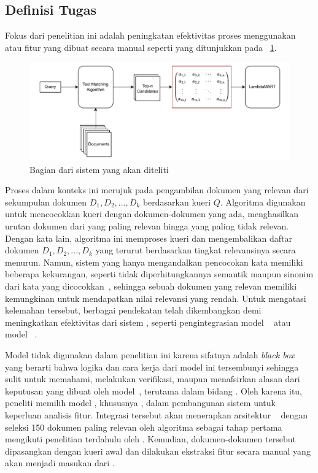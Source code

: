\subsection{Definisi Tugas}
\label{subbab:3:Definisi Tugas}
Fokus dari penelitian ini adalah peningkatan efektivitas proses \retrieval{} menggunakan \hcf{} atau fitur yang dibuat secara manual seperti yang ditunjukkan pada \gambar{}~\ref{fig:posisiPenelitian}.
\begin{figure}[!ht]
    \centering
    \includegraphics[scale=0.75]{assets/pdfs/PosisiPenelitian.pdf}
    \caption{Bagian dari sistem \ir{} yang akan diteliti}
    \label{fig:posisiPenelitian}
\end{figure}
Proses \retrieval{} dalam konteks ini merujuk pada pengambilan dokumen yang relevan dari sekumpulan dokumen \(D_1,D_2,...,D_k\) berdasarkan kueri \(Q\). Algoritma \txt{} \matching{} digunakan untuk mencocokkan kueri dengan dokumen-dokumen yang ada, menghasilkan urutan dokumen dari yang paling relevan hingga yang paling tidak relevan. Dengan kata lain, algoritma ini memproses kueri dan mengembalikan daftar dokumen \(D_1,D_2,...,D_k\) yang terurut berdasarkan tingkat relevansinya secara menurun. Namun, sistem \ir{} yang hanya mengandalkan pencocokan kata memiliki beberapa kekurangan, seperti tidak diperhitungkannya semantik maupun sinonim dari kata yang dicocokkan~\citep{hambarde2023information}, sehingga sebuah dokumen yang relevan memiliki kemungkinan untuk mendapatkan nilai relevansi yang rendah. Untuk mengatasi kelemahan tersebut, berbagai pendekatan telah dikembangkan demi meningkatkan efektivitas dari sistem \ir{}, seperti pengintegrasian model \ml{}~\citep{burges2010ranknet} atau model \nn{}~\citep{1223700}.

Model \nn{} tidak digunakan dalam penelitian ini karena sifatnya adalah \textit{black box} yang berarti bahwa logika dan cara kerja dari model ini tersembunyi sehingga sulit untuk memahami, melakukan verifikasi, maupun menafsirkan alasan dari keputusan yang dibuat oleh model~\citep{electronics8080832}, terutama dalam bidang \ir{}. Oleh karena itu, peneliti memilih model \ml{}, khususnya \lambdamart{}, dalam pembangunan sistem \ir{} untuk keperluan analisis fitur. Integrasi tersebut akan menerapkan arsitektur \cascaded{}~\citep{wang2011cascade} dengan seleksi 150 dokumen paling relevan oleh algoritma \txt{} \matching{} sebagai tahap pertama mengikuti penelitian terdahulu oleh \citet{nguyen2024captain}. Kemudian, dokumen-dokumen tersebut dipasangkan dengan kueri awal dan dilakukan ekstraksi fitur secara manual yang akan menjadi masukan dari \lambdamart{}. 
